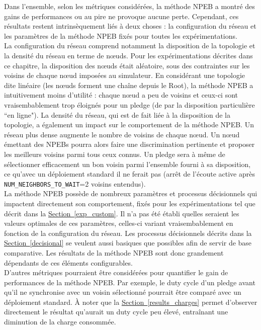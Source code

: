 \documentclass[]{report}
\newcommand{\wordlink}[2]{\hyperref[#2]{#1~\ref{#2}}}
\begin{document}
Dans l'ensemble, selon les métriques considérées, la méthode NPEB a montré des gains de performances ou au pire ne provoque aucune perte. Cependant, ces résultats restent intrinsèquement liés à deux choses : la configuration du réseau et les paramètres de la méthode NPEB fixés pour toutes les expérimentations.\\

La configuration du réseau comprend notamment la disposition de la topologie et la densité du réseau en terme de nœuds. Pour les expérimentations décrites dans ce chapitre, la disposition des nœuds était aléatoire, sous des contraintes sur les voisins de chaque nœud imposées au simulateur. En considérant une topologie dite linéaire (les nœuds forment une chaîne depuis le Root), la méthode NPEB a intuitivement moins d'utilité : chaque nœud a peu de voisins et ceux-ci sont vraisembablement trop éloignés pour un pledge (de par la disposition particulière ``en ligne"). La densité du réseau, qui est de fait liée à la disposition de la topologie, a également un impact sur le comportement de la méthode NPEB. Un réseau plus dense augmente le nombre de voisins de chaque nœud. Un nœud émettant des NPEBs pourra alors faire une discrimination pertinente et proposer les meilleurs voisins parmi tous ceux connus. Un pledge sera à même de sélectionner efficacement un bon voisin parmi l'ensemble fourni à sa disposition, ce qu'avec un déploiement standard il ne ferait pas (arrêt de l'écoute active après \texttt{NUM\_NEIGHBORS\_TO\_WAIT}=2 voisins entendus).\\

La méthode NPEB possède de nombreux paramètres et processus décisionnels qui impactent directement son comportement, fixés pour les expérimentations tel que décrit dans la \wordlink{Section}{exp_custom}. Il n'a pas été établi quelles seraient les valeurs optimales de ces paramètres, celles-ci variant vraisembablement en fonction de la configuration du réseau. Les processus décisionnels décrits dans la \wordlink{Section}{decisional} se veulent aussi basiques que possibles afin de servir de base comparative. Les résultats de la méthode NPEB sont donc grandement dépendants de ces éléments configurables.\\

D'autres métriques pourraient être considérées pour quantifier le gain de performances de la méthode NPEB. Par exemple, le duty cycle d'un pledge avant qu'il ne synchronise avec un voisin sélectionné pourrait être comparé avec un déploiement standard. À noter que la \wordlink{Section}{results_charges} permet d'observer directement le résultat qu'aurait un duty cycle peu élevé, entraînant une diminution de la charge consommée.\\
\end{document}
